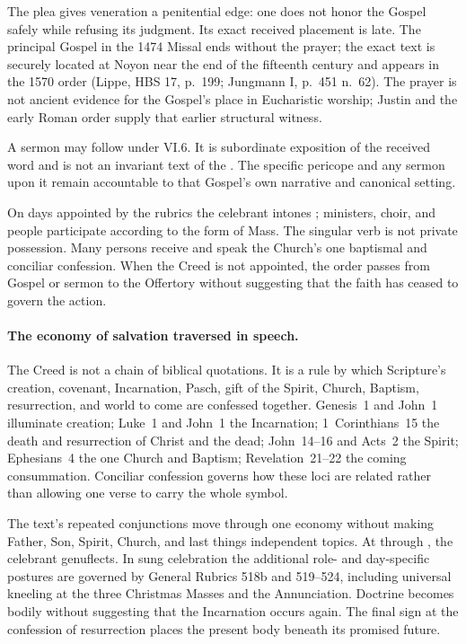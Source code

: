 The plea  gives veneration a penitential edge: one does not honor the Gospel safely while refusing its judgment. Its exact received placement is late. The principal Gospel in the 1474 Missal ends without the prayer; the exact text is securely located at Noyon near the end of the fifteenth century and appears in the 1570 order (Lippe, HBS 17, p.~199; Jungmann I, p.~451 n.~62). The prayer is not ancient evidence for the Gospel's place in Eucharistic worship; Justin and the early Roman order supply that earlier structural witness.

A sermon may follow under  VI.6. It is subordinate exposition of the received word and is not an invariant text of the . The specific pericope and any sermon upon it remain accountable to that Gospel's own narrative and canonical setting.


On days appointed by the rubrics the celebrant intones ; ministers, choir, and people participate according to the form of Mass. The singular verb is not private possession. Many persons receive and speak the Church's one baptismal and conciliar confession. When the Creed is not appointed, the order passes from Gospel or sermon to the Offertory without suggesting that the faith has ceased to govern the action.

\paragraph{The economy of salvation traversed in speech.}
The Creed is not a chain of biblical quotations. It is a rule by which Scripture's creation, covenant, Incarnation, Pasch, gift of the Spirit, Church, Baptism, resurrection, and world to come are confessed together. Genesis~1 and John~1 illuminate creation; Luke~1 and John~1 the Incarnation; 1~Corinthians~15 the death and resurrection of Christ and the dead; John~14--16 and Acts~2 the Spirit; Ephesians~4 the one Church and Baptism; Revelation~21--22 the coming consummation. Conciliar confession governs how these loci are related rather than allowing one verse to carry the whole symbol.

The text's repeated conjunctions move through one economy without making Father, Son, Spirit, Church, and last things independent topics. At  through , the celebrant genuflects. In sung celebration the additional role- and day-specific postures are governed by General Rubrics 518b and 519--524, including universal kneeling at the three Christmas Masses and the Annunciation. Doctrine becomes bodily without suggesting that the Incarnation occurs again. The final sign at the confession of resurrection places the present body beneath its promised future.

